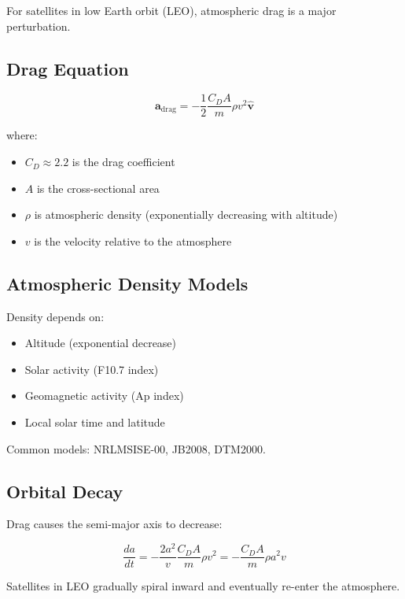 For satellites in low Earth orbit (LEO), atmospheric drag is a major perturbation.

\subsection{Drag Equation}

\begin{equation}
    \mathbf{a}_{\text{drag}} = -\frac{1}{2}\frac{C_D A}{m}\rho v^2 \hat{\mathbf{v}}
\end{equation}

where:
\begin{itemize}
    \item $C_D \approx 2.2$ is the drag coefficient
    \item $A$ is the cross-sectional area
    \item $\rho$ is atmospheric density (exponentially decreasing with altitude)
    \item $v$ is the velocity relative to the atmosphere
\end{itemize}

\subsection{Atmospheric Density Models}

Density depends on:
\begin{itemize}
    \item Altitude (exponential decrease)
    \item Solar activity (F10.7 index)
    \item Geomagnetic activity (Ap index)
    \item Local solar time and latitude
\end{itemize}

Common models: NRLMSISE-00, JB2008, DTM2000.

\subsection{Orbital Decay}

Drag causes the semi-major axis to decrease:

\begin{equation}
    \frac{da}{dt} = -\frac{2a^2}{v}\frac{C_D A}{m}\rho v^2 = -\frac{C_D A}{m}\rho a^2 v
\end{equation}

Satellites in LEO gradually spiral inward and eventually re-enter the atmosphere.

